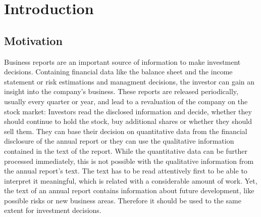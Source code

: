 \chapter{Introduction}\label{ch:intro}




\section{Motivation}
Business reports are an important source of information to make investment decisions.
Containing financial data like the balance sheet and the income statement or risk estimations and managment decisions, the investor can gain an insight into the company's business.
These reports are released periodically, usually every quarter or year, and lead to a revaluation of the company on the stock market:
Investors read the disclosed information and decide, whether they should continue to hold the stock, buy additional shares or whether they should sell them.
They can base their decision on quantitative data from the financial disclosure of the annual report or they can use the qualitative information contained in the text of the report.
While the quantitative data can be further processed immediately, this is not possible with the qualitative information from the annual report's text.
The text has to be read attentively first to be able to interpret it meaningful, which is related with a considerable amount of work.
Yet, the text of an annual report contains information about future development, like possible risks or new business areas.
Therefore it should be used to the same extent for investment decisions.

